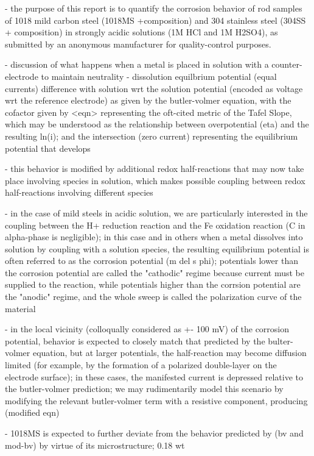 - the purpose of this report is to quantify the corrosion behavior of rod samples of 1018 mild carbon steel (1018MS +composition) and 304 stainless steel (304SS + composition) in strongly acidic solutions (1M HCl and 1M H2SO4), as submitted by an anonymous manufacturer for quality-control purposes.

- discussion of what happens when a metal is placed in solution with a counter-electrode to maintain neutrality - dissolution equilbrium potential (equal currents) difference with solution wrt the solution potential (encoded as voltage wrt the reference electrode) as given by the butler-volmer equation, with the cofactor given by <eqn> representing the oft-cited metric of the Tafel Slope, which may be understood as the relationship between overpotential (eta) and the resulting ln(i); and the intersection (zero current) representing the equilibrium potential that develops

- this behavior is modified by additional redox half-reactions that may now take place involving species in solution, which makes possible coupling between redox half-reactions involving different species

- in the case of mild steels in acidic solution, we are particularly interested in the coupling between the H+ reduction reaction and the Fe oxidation reaction (C in alpha-phase is negligible); in this case and in others when a metal dissolves into solution by coupling with a solution species, the resulting equilibrium potential is often referred to as the corrosion potential (m del s phi); potentials lower than the corrosion potential are called the "cathodic" regime because current must be supplied to the reaction, while potentials higher than the corrsion potential are the "anodic" regime, and the whole sweep is called the polarization curve of the material

- in the local vicinity (colloqually considered as +- 100 mV) of the corrosion potential, behavior is expected to closely match that predicted by the bulter-volmer equation, but at larger potentials, the half-reaction may become diffusion limited (for example, by the formation of a polarized double-layer on the electrode surface); in these cases, the manifested current is depressed relative to the butler-volmer prediction; we may rudimentarily model this scenario by modifying the relevant butler-volmer term with a resistive component, producing (modified eqn)

- 1018MS is expected to further deviate from the behavior predicted by (bv and mod-bv) by virtue of its microstructure; 0.18 wt%

